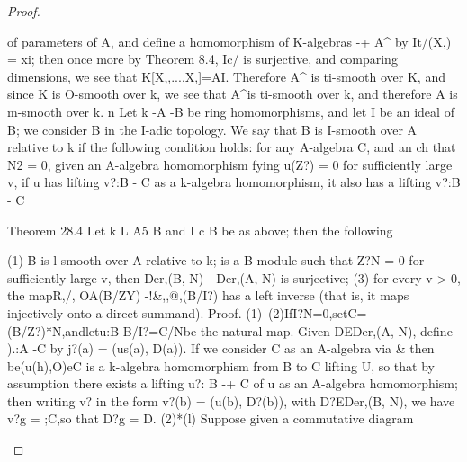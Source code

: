\begin{proof}
\begin{mathematicalrecord}
{{    of parameters       of A, and define a homomorphism          of K-algebras
                         -+ A^ by It/(X,) = xi; then once more by Theorem 8.4,
    Ic/ is surjective, and comparing dimensions, we see that
              K[X,,...,X,]=AI.
    Therefore A^ is ti-smooth over K, and since K is O-smooth over k, we
    see that A^is ti-smooth over k, and therefore A is m-smooth over k. n
       Let k -A       -B       be ring homomorphisms,      and let I be an ideal of B;
    we consider B in the I-adic topology. We say that B is I-smooth over A
    relative to k if the following condition holds: for any A-algebra C, and an
                           ch that N2 = 0, given an A-algebra homomorphism
                           fying u(Z?) = 0 for sufficiently large v, if u has lifting
    v?:B - C as a k-algebra homomorphism,              it also has a lifting v?:B - C




    Theorem 28.4 Let k L       A5     B and I c B be as above; then the following

       (1) B is l-smooth over A relative to k;
                  is a B-module such that Z?N = 0 for sufficiently large v, then
    Der,(B, N) - Der,(A, N) is surjective;
       (3) for every v > 0, the mapR,/, OA(B/ZY) -!&,,@,(B/I?)             has a left
    inverse (that is, it maps injectively onto a direct summand).
    Proof. (1)~(2)IfI?N=0,setC=(B/Z?)*N,andletu:B-B/I?=C/Nbe
    the natural map. Given DEDer,(A, N), define ).:A -C                   by j?(a) =
    (us(a), D(a)). If we consider C as an A-algebra via & then be(u(h),O)eC
    is a k-algebra homomorphism        from B to C lifting U, so that by assumption
    there exists a lifting u?: B -+ C of u as an A-algebra homomorphism;        then
    writing v? in the form
               v?(b) = (u(b), D?(b)), with D?EDer,(B, N),
    we have v?g = ;C,so that D?g = D.
       (2)*(l)    Suppose given a commutative diagram

}}
\end{mathematicalrecord}
\end{proof}
